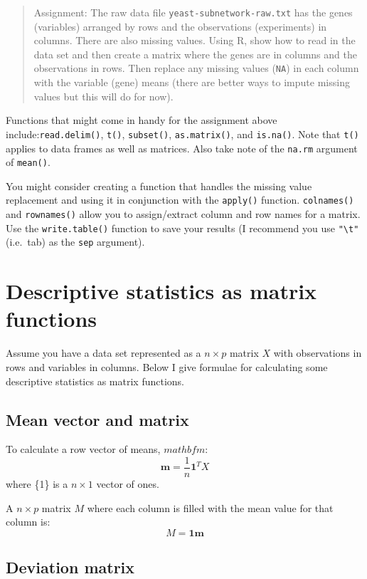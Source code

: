 \documentclass{article}
\begin{document}
\begin{quote}
Assignment: The raw data file \lstinline!yeast-subnetwork-raw.txt! has
the genes (variables) arranged by rows and the observations
(experiments) in columns. There are also missing values. Using R, show
how to read in the data set and then create a matrix where the genes are
in columns and the observations in rows. Then replace any missing values
(\lstinline!NA!) in each column with the variable (gene) means (there
are better ways to impute missing values but this will do for now).

\end{quote}
Functions that might come in handy for the assignment above
include:\lstinline!read.delim()!, \lstinline!t()!, \lstinline!subset()!,
\lstinline!as.matrix()!, and \lstinline!is.na()!. Note that
\lstinline!t()! applies to data frames as well as matrices. Also take
note of the \lstinline!na.rm! argument of \lstinline!mean()!.

You might consider creating a function that handles the missing value
replacement and using it in conjunction with the \lstinline!apply()!
function. \lstinline!colnames()! and \lstinline!rownames()! allow you to
assign/extract column and row names for a matrix. Use the
\lstinline!write.table()! function to save your results (I recommend you
use \lstinline!"\t"! (i.e.~tab) as the \lstinline!sep! argument).

\section{Descriptive statistics as matrix functions}

Assume you have a data set represented as a $n \times p$ matrix $X$ with
observations in rows and variables in columns. Below I give formulae for
calculating some descriptive statistics as matrix functions.

\subsection{Mean vector and matrix}

To calculate a row vector of means, $mathbf{m}$: \[
\mathbf{m} = \frac{1}{n} \mathbf{1}^T  X
\] where \{1\} is a $n \times 1$ vector of ones.

A $n \times p$ matrix $M$ where each column is filled with the mean
value for that column is: \[
M = \mathbf{1}\mathbf{m}
\]

\subsection{Deviation matrix}
\end{document}
